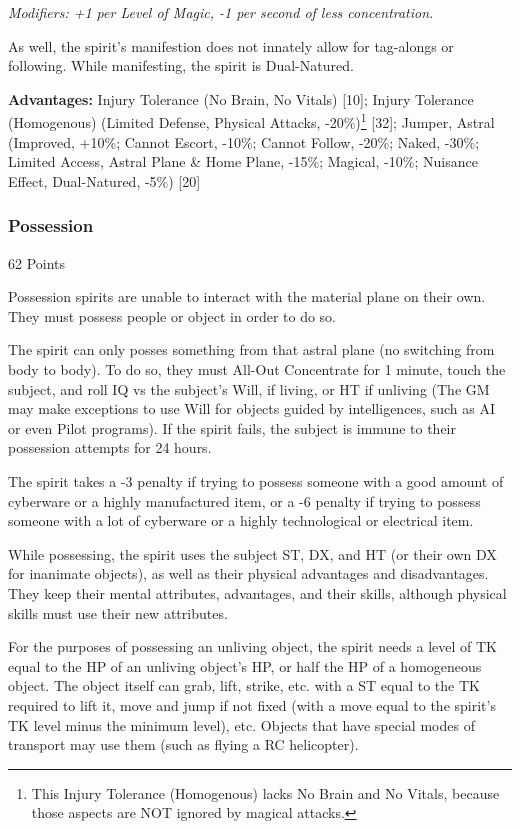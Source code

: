 \begin{multicols}{3}
	\textit{\textcolor{NavyBlue}{Modifiers: +1 per Level of Magic, -1 per second of less concentration.}}
	
	As well, the spirit's manifestion does not innately allow for tag-alongs or following. While manifesting, the spirit is Dual-Natured.
	
	\textbf{Advantages:} 
	Injury Tolerance (No Brain, No Vitals) [10]; Injury Tolerance (Homogenous) (Limited Defense, Physical Attacks, -20\%)\footnote{This Injury Tolerance (Homogenous) lacks No Brain and No Vitals, because those aspects are NOT ignored by magical attacks.} [32]; Jumper, Astral (Improved, +10\%; Cannot Escort, -10\%; Cannot Follow, -20\%; Naked, -30\%; Limited Access, Astral Plane \& Home Plane, -15\%; Magical, -10\%; Nuisance Effect, Dual-Natured, -5\%) [20]
	
	\subsubsection*{Possession}
	\begin{flushright}
		62 Points
	\end{flushright}
	
	Possession spirits are unable to interact with the material plane on their own. They must possess people or object in order to do so.
	
	The spirit can only posses something from that astral plane (no switching from body to body). To do so, they must All-Out Concentrate for 1 minute, touch the subject, and roll IQ vs the subject's Will, if living, or HT if unliving (The GM may make exceptions to use Will for objects guided by intelligences, such as AI or even Pilot programs). If the spirit fails, the subject is immune to their possession attempts for 24 hours.
	
	The spirit takes a -3 penalty if trying to possess someone with a good amount of cyberware or a highly manufactured item, or a -6 penalty if trying to possess someone with a lot of cyberware or a highly technological or electrical item.
	
	While possessing, the spirit uses the subject ST, DX, and HT (or their own DX for inanimate objects), as well as their physical advantages and disadvantages. They keep their mental attributes, advantages, and their skills, although physical skills must use their new attributes.
	
	For the purposes of possessing an unliving object, the spirit needs a level of TK equal to the HP of an unliving object's HP, or half the HP of a homogeneous object. The object itself can grab, lift, strike, etc. with a ST equal to the TK required to lift it, move and jump if not fixed (with a move equal to the spirit's TK level minus the minimum level), etc. Objects that have special modes of transport may use them (such as flying a RC helicopter).
	

\end{multicols}
